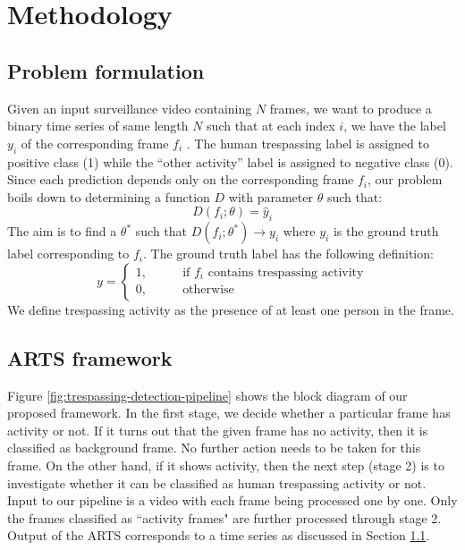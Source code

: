 \section{Methodology}
\label{sec:methodology}
\subsection{Problem formulation}
\label{sec:prob-formulation}
Given an input surveillance video containing $N$ frames, we want to produce a binary time series of same length $N$ such that at each index $i$, we have the label $y_i$ of the corresponding frame $f_i$ . The human trespassing label is assigned to positive class (1) while the ``other activity'' label is assigned to negative class (0). Since each prediction depends only on the corresponding frame $f_i$, our problem boils down to determining a function $D$ with parameter $\theta$ such that:
$$ D(f_i;\theta) = \hat{y}_i $$
The aim is to find a $\theta^*$ such that $D(f_i;\theta^*) \rightarrow y_i$ where $y_i$ is the ground truth label corresponding to $f_i$. The ground truth label has the following definition: 
$$y=
\begin{cases}
1,  &\qquad \textrm{if } f_i \textrm{ contains trespassing activity} \\ 
0, 	&\qquad \textrm{otherwise}
\end{cases}
$$
We define trespassing activity as the presence of at  least one person in the frame. 

\subsection{ARTS framework}
\label{sec:proposed-framework}
Figure \ref{fig:trespassing-detection-pipeline} shows the block diagram of our proposed framework. In the first stage, we decide whether a particular frame has activity or not. If it turns out that the given frame has no activity, then it is classified as background frame. No further action needs to be taken for this frame. On the other hand, if it shows activity, then the next step (stage 2) is to investigate whether it can be classified as human trespassing activity or not. Input to our pipeline is a video with each frame being processed one by one. Only the frames classified as  ``activity frames" are further processed through stage 2. Output of the ARTS corresponds to a time series as discussed in Section \ref{sec:prob-formulation}. 

